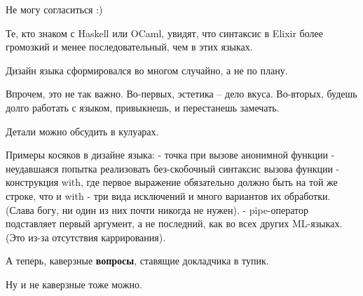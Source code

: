 \documentclass[10pt]{beamer}
\begin{document}
Не могу согласиться :)

Те, кто знаком с Haskell или OCaml, увидят, что синтаксис в Elixir более громозкий и менее последовательный, чем в этих языках.

Дизайн языка сформировался во многом случайно, а не по плану.

Впрочем, это не так важно. Во-первых, эстетика -- дело вкуса. Во-вторых, будешь долго работать с языком, привыкнешь, и перестанешь замечать.

Детали можно обсудить в кулуарах.

Примеры косяков в дизайне языка:
- точка при вызове анонимной функции
- неудавшаяся попытка реализовать без-скобочный синтаксис вызова функции
- конструкция with, где первое выражение обязательно должно быть на той же строке, что и with
- три вида исключений и много вариантов их обработки. (Слава богу, ни один из них почти никогда не нужен).
- pipe-оператор подставляет первый аргумент, а не последний, как во всех других ML-языках. (Это из-за отсутствия каррирования).


\fi

{
\begin{frame}
\centering
А теперь, каверзные \textbf{вопросы}, ставящие докладчика в тупик.
\par \bigskip
Ну и не каверзные тоже можно.
\end{frame}
}
\end{document}
